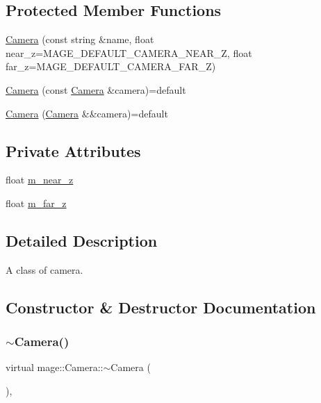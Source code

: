 \subsection*{Protected Member Functions}
\begin{DoxyCompactItemize}
\item 
\hyperlink{classmage_1_1_camera_a8c8e833afa2898625e7d7a46e14b31b4}{Camera} (const string \&name, float near\+\_\+z=M\+A\+G\+E\+\_\+\+D\+E\+F\+A\+U\+L\+T\+\_\+\+C\+A\+M\+E\+R\+A\+\_\+\+N\+E\+A\+R\+\_\+Z, float far\+\_\+z=M\+A\+G\+E\+\_\+\+D\+E\+F\+A\+U\+L\+T\+\_\+\+C\+A\+M\+E\+R\+A\+\_\+\+F\+A\+R\+\_\+Z)
\item 
\hyperlink{classmage_1_1_camera_a7804afa68565efe4c48f95453d6c65f0}{Camera} (const \hyperlink{classmage_1_1_camera}{Camera} \&camera)=default
\item 
\hyperlink{classmage_1_1_camera_a595d9c89176aac92bbd58f4117c05ea9}{Camera} (\hyperlink{classmage_1_1_camera}{Camera} \&\&camera)=default
\end{DoxyCompactItemize}
\subsection*{Private Attributes}
\begin{DoxyCompactItemize}
\item 
float \hyperlink{classmage_1_1_camera_a685f8700a29d1f1eff2bec353c3ec970}{m\+\_\+near\+\_\+z}
\item 
float \hyperlink{classmage_1_1_camera_abe2eeca725ce3da238256007454b241f}{m\+\_\+far\+\_\+z}
\end{DoxyCompactItemize}


\subsection{Detailed Description}
A class of camera. 

\subsection{Constructor \& Destructor Documentation}
\hypertarget{classmage_1_1_camera_a181f7fdf168c0d66022edfecb697dd7d}{}\label{classmage_1_1_camera_a181f7fdf168c0d66022edfecb697dd7d} 
\subsubsection{\texorpdfstring{$\sim$\+Camera()}{~Camera()}}
{\footnotesize\ttfamily virtual mage\+::\+Camera\+::$\sim$\+Camera (\begin{DoxyParamCaption}{ }\end{DoxyParamCaption})\hspace{0.3cm}{\ttfamily [virtual]}, {\ttfamily [default]}}

